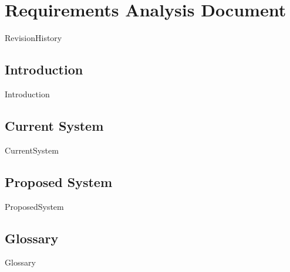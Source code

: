 


	\part*{Requirements Analysis Document}

	{RevisionHistory}
	\newpage

	\tableofcontents* %
	\newpage

	\chapter{Introduction}
	{Introduction}
	\newpage

	\chapter{Current System}
	{CurrentSystem}

	\chapter{Proposed System}
	{ProposedSystem}

	\chapter{Glossary}
	{Glossary}

\texttt{}